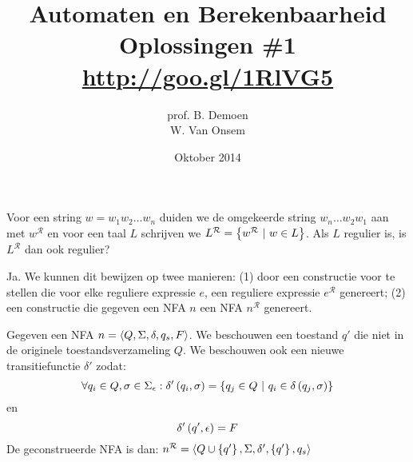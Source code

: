 \documentclass[a4paper]{article}
\title{Automaten en Berekenbaarheid\\Oplossingen \#1\\\url{http://goo.gl/1RlVG5}}
\author{prof. B. Demoen\\W. Van Onsem}
\date{Oktober 2014}
\newcommand{\R}{\mathcal{R}}
\begin{document}
\maketitle

\begin{question}
Voor een string $w = w_1 w_2 \ldots w_n$ duiden we de omgekeerde string $w_n \ldots w_2  w_1$ aan met $w^{\R}$ en voor een taal $L$ schrijven we $L^{\R} = \condset{w^{\R}}{w\in L}$. Als $L$ regulier is, is $L^{\R}$ dan ook regulier?
\begin{answer}
Ja. We kunnen dit bewijzen op twee manieren: (1) door een constructie voor te stellen die voor elke reguliere expressie $e$, een reguliere expressie $e^{\R}$ genereert;  (2) een constructie die gegeven een NFA $n$ een NFA $n^{\R}$ genereert.
\begin{construction}
Gegeven een NFA $n=\left\langle Q,\Sigma,\delta,q_s,F \right\rangle$. We beschouwen een toestand $q'$ die niet in de originele toestandsverzameling $Q$. We beschouwen ook een nieuwe transitiefunctie $\delta'$ zodat:
\begin{equation}
\forall q_i\in Q,\sigma\in\Sigma_\epsilon:\delta'\left( q_i,\sigma \right)=\left\{ q_j\in Q\ |\ q_i\in\delta\left( q_j,\sigma \right) \right\}
\end{equation}
en
\begin{equation}
\delta'\left( q',\epsilon \right)=F
\end{equation}
De geconstrueerde NFA is dan: $n^{\R}=\tupl{Q\cup\accl{q'},\Sigma,\delta',\accl{q'},q_s}$
\end{construction}
\end{answer}
\end{question}
\end{document}
